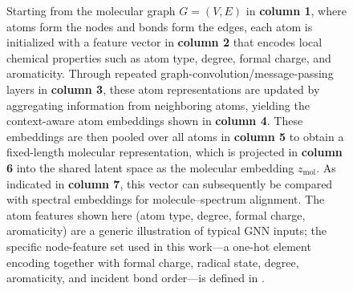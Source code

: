 \begin{figure}[ht]
    \centering
    \resizebox{0.9\textwidth}{!}{%
    }
    \caption[Graph-convolutional molecular encoding workflow]{
        Starting from the molecular graph $G=(V,E)$ in \textbf{column 1}, where atoms form the nodes and bonds form the edges, each atom is initialized with a feature vector in \textbf{column 2} that encodes local chemical properties such as atom type, degree, formal charge, and aromaticity.
        Through repeated graph-convolution/message-passing layers in \textbf{column 3}, these atom representations are updated by aggregating information from neighboring atoms, yielding the context-aware atom embeddings shown in \textbf{column 4}.
        These embeddings are then pooled over all atoms in \textbf{column 5} to obtain a fixed-length molecular representation, which is projected in \textbf{column 6} into the shared latent space as the molecular embedding $z_{\mathrm{mol}}$.
        As indicated in \textbf{column 7}, this vector can subsequently be compared with spectral embeddings for molecule--spectrum alignment.
        The atom features shown here (atom type, degree, formal charge, aromaticity) are a generic illustration of typical GNN inputs; the specific node-feature set used in this work---a one-hot element encoding together with formal charge, radical state, degree, aromaticity, and incident bond order---is defined in .
    }
    \label{fig:gnn-encoding-workflow}
\end{figure}
